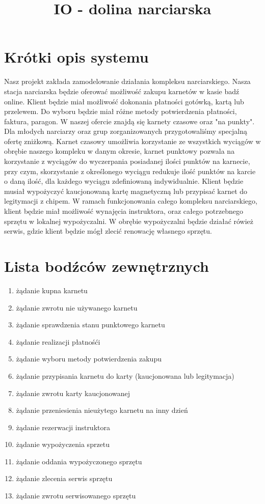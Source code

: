 \documentclass{sprawozdanie-agh}
\title{IO - dolina narciarska}
\begin{document}

\stronatytulowa{}

\tableofcontents

\newpage

\section{Krótki opis systemu}
\large
Nasz projekt zakłada zamodelowanie działania kompleksu narciarskiego. Nasza stacja narciarska będzie oferować możliwość zakupu karnetów w kasie badź online. Klient będzie miał możliwość dokonania płatności gotówką, kartą lub przelewem. Do wyboru będzie miał różne metody potwierdzenia płatności, faktura, paragon. W naszej ofercie znajdą się karnety czasowe oraz "na punkty". Dla młodych narciarzy oraz grup zorganizowanych przygotowaliśmy specjalną ofertę zniżkową. Karnet czasowy umożliwia korzystanie ze wszystkich wyciągów w obrębie naszego kompleku w danym okresie, karnet punktowy pozwala na korzystanie z wyciągów do wyczerpania posiadanej ilości punktów na karnecie, przy czym, skorzystanie z określonego wyciągu redukuje ilość punktów na karcie o daną ilość, dla każdego wyciągu zdefiniowaną indywidualnie. Klient będzie musiał wypożyczyć kaucjonowaną kartę magnetyczną lub przypisać karnet do legitymacji z chipem. W ramach funkcjonowania całego kompleksu narciarskiego, klient będzie miał możliwość wynajęcia instruktora, oraz całego potrzebnego sprzętu w lokalnej wypożyczalni. W obrębie wypożyczalni będzie działać rówież serwis, gdzie klient będzie mógł zlecić renowację własnego sprzętu.

\section{Lista bodźców zewnętrznych}
\begin{enumerate}
	\item żądanie kupna karnetu
	\item żądanie zwrotu nie używanego karnetu
	\item żądanie sprawdzenia stanu punktowego karnetu
	\item żądanie realizacji płatnośći
	\item żądanie wyboru metody potwierdzenia zakupu
	\item żądanie przypisania karnetu do karty (kaucjonowana lub legitymacja)
	\item żądanie zwrotu karty kaucjonowanej
	\item żądanie przeniesienia nieużytego karnetu na inny dzień
	\item żądanie rezerwacji instruktora
	\item żądanie wypożyczenia sprzetu
	\item żądanie oddania wypożyczonego sprzętu
	\item żądanie zlecenia serwis sprzętu
	\item żądanie zwrotu serwisowanego sprzętu
\end{enumerate}
\end{document}
